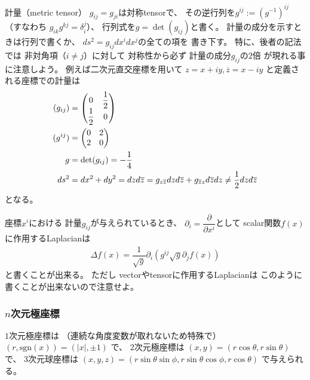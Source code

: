 計量（metric tensor）
$g_{ij} = g_{ji}$は対称tensorで、
その逆行列を$g^{ij} := (g^{-1})^{ij}$
（すなわち
$g_{ik} g^{kj} = \delta_i^j$）、
行列式を$g = \det (g_{ij})$と書く。
計量の成分を示すときは行列で書くか、
$ds^2 = g_{ij} dx^i dx^j$の全ての項を
書き下す。
特に、後者の記法では
非対角項（$i \neq j$）に対して
対称性から必ず
計量の成分$g_{ij}$の$2$倍
が現れる事に注意しよう。
例えば二次元直交座標を用いて
$z = x + i y,
\overline{z} = x - i y$
と定義される座標での計量は
\begin{subequations}
\begin{align}
    (g_{ij})
&=
    \begin{pmatrix}
        0 & \dfrac{1}{2}
    \\
        \dfrac{1}{2} & 0
    \end{pmatrix}
\notag\\
    (g^{ij})
&=
    \begin{pmatrix}
        0 & 2
    \\
        2 & 0
    \end{pmatrix}
\\
    g
&=
    \det(g_{ij})
    = - \dfrac{1}{4}
\\
    ds^2
&=
    dx^2 + dy^2
=
    d z
    d \overline{z}
=
    g_{z \overline{z}}
    d z
    d \overline{z}
+
    g_{\overline{z} z}
    d \overline{z}
    d z
\neq \dfrac{1}{2} 
    d z
    d \overline{z}
\end{align}
\end{subequations}
となる。

座標$x^i$における
計量$g_{ij}$が与えられているとき、
$\partial_i = \dfrac{\partial}{\partial x^i}$として
scalar関数$f(x)$に作用するLaplacianは
\begin{align}
    \Delta f(x)
    =
    \dfrac{1}{ \sqrt {g} }
    \partial_i
    \left(
        g^{ij}
        \sqrt{ g }
        \partial_j
        f (x)
    \right)
\label{laplacian of scalar in terms of metric}
\end{align}
と書くことが出来る。
ただし
vectorやtensorに作用するLaplacianは
このように書くことが出来ないので注意せよ。

\subsubsection{$n$次元極座標}

$1$次元極座標は
（連続な角度変数が取れないため特殊で）
$(r, \mathrm{sgn}(x)) = (|x|, \pm 1)$
で、
$2$次元極座標は
$(x, y) = (r \cos \theta, r \sin \theta)$
で、
$3$次元球座標は
$(x, y, z)
=
    (r \sin \theta \sin \phi,
    r \sin \theta \cos \phi,
    r \cos \theta)$
で与えられる。

